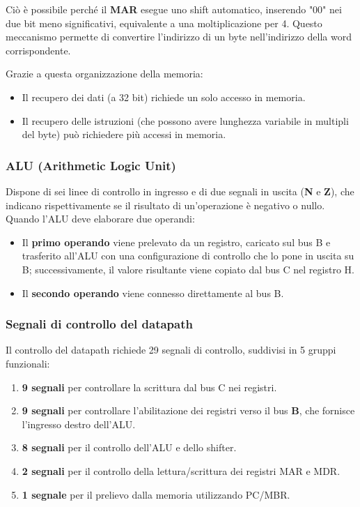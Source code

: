 Ciò è possibile perché il \textbf{MAR} esegue uno shift automatico, inserendo "00" nei due bit meno significativi, equivalente a una moltiplicazione per 4. Questo meccanismo permette di convertire l'indirizzo di un byte nell'indirizzo della word corrispondente.

Grazie a questa organizzazione della memoria:
\begin{itemize}
    \item Il recupero dei dati (a 32 bit) richiede un solo accesso in memoria.
    \item Il recupero delle istruzioni (che possono avere lunghezza variabile in multipli del byte) può richiedere più accessi in memoria.
\end{itemize}

\subsubsection*{ALU (Arithmetic Logic Unit)}

Dispone di sei linee di controllo in ingresso e di due segnali in uscita (\textbf{N} e \textbf{Z}), che indicano rispettivamente se il risultato di un'operazione è negativo o nullo. Quando l'ALU deve elaborare due operandi:
\begin{itemize}
    \item Il \textbf{primo operando} viene prelevato da un registro, caricato sul bus B e trasferito all'ALU con una configurazione di controllo che lo pone in uscita su B; successivamente, il valore risultante viene copiato dal bus C nel registro H.
    \item Il \textbf{secondo operando} viene connesso direttamente al bus B.
\end{itemize}

\subsubsection*{Segnali di controllo del datapath}

Il controllo del datapath richiede 29 segnali di controllo, suddivisi in 5 gruppi funzionali:
\begin{enumerate}
    \item \textbf{9 segnali} per controllare la scrittura dal bus C nei registri.
    \item \textbf{9 segnali} per controllare l'abilitazione dei registri verso il bus \textbf{B}, che fornisce l'ingresso destro dell'ALU.
    \item \textbf{8 segnali} per il controllo dell'ALU e dello shifter.
    \item \textbf{2 segnali} per il controllo della lettura/scrittura dei registri MAR e MDR.
    \item \textbf{1 segnale} per il prelievo dalla memoria utilizzando PC/MBR.
\end{enumerate}

